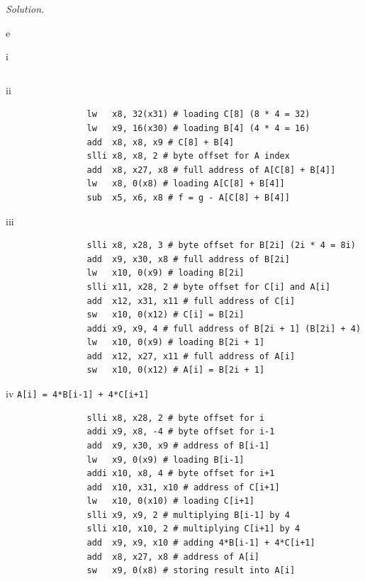 \documentclass[11pt]{article}
\newenvironment{solution}{\par\noindent\textit{Solution.}}{\par\vspace{1em}}
\begin{document}
\begin{solution}
\begin{subproblem}{e}
\begin{subproblem}{i}
\begin{verbatim}
            \end{verbatim}
        \end{subproblem}
        \begin{subproblem}{ii}
            \begin{verbatim}
                lw   x8, 32(x31) # loading C[8] (8 * 4 = 32)
                lw   x9, 16(x30) # loading B[4] (4 * 4 = 16)
                add  x8, x8, x9 # C[8] + B[4]
                slli x8, x8, 2 # byte offset for A index
                add  x8, x27, x8 # full address of A[C[8] + B[4]]
                lw   x8, 0(x8) # loading A[C[8] + B[4]]
                sub  x5, x6, x8 # f = g - A[C[8] + B[4]]
            \end{verbatim}
        \end{subproblem}
        \begin{subproblem}{iii}
            \begin{verbatim}
                slli x8, x28, 3 # byte offset for B[2i] (2i * 4 = 8i)
                add  x9, x30, x8 # full address of B[2i]
                lw   x10, 0(x9) # loading B[2i]
                slli x11, x28, 2 # byte offset for C[i] and A[i]
                add  x12, x31, x11 # full address of C[i]
                sw   x10, 0(x12) # C[i] = B[2i]
                addi x9, x9, 4 # full address of B[2i + 1] (B[2i] + 4)
                lw   x10, 0(x9) # loading B[2i + 1]
                add  x12, x27, x11 # full address of A[i]
                sw   x10, 0(x12) # A[i] = B[2i + 1]
            \end{verbatim}
        \end{subproblem}
        \begin{subproblem}{iv}
            \texttt{A[i] = 4*B[i-1] + 4*C[i+1]}
            \begin{verbatim}
                slli x8, x28, 2 # byte offset for i
                addi x9, x8, -4 # byte offset for i-1
                add  x9, x30, x9 # address of B[i-1]
                lw   x9, 0(x9) # loading B[i-1]
                addi x10, x8, 4 # byte offset for i+1
                add  x10, x31, x10 # address of C[i+1]
                lw   x10, 0(x10) # loading C[i+1]
                slli x9, x9, 2 # multiplying B[i-1] by 4
                slli x10, x10, 2 # multiplying C[i+1] by 4
                add  x9, x9, x10 # adding 4*B[i-1] + 4*C[i+1]
                add  x8, x27, x8 # address of A[i]
                sw   x9, 0(x8) # storing result into A[i]
            \end{verbatim}
        \end{subproblem}

\end{subproblem}
\end{solution}
\end{document}
